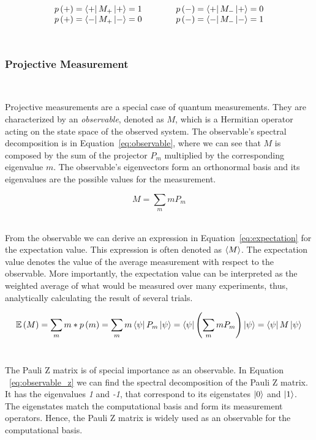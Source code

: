 \begin{equation}\label{eq:hadamard_states}
  \begin{matrix}
    p\left(+\right) = \bra{+}M_+\ket{+} = 1 \\
    p\left(+\right) = \bra{-}M_+\ket{-} = 0
  \end{matrix} \qquad \qquad
  \begin{matrix}
    p\left(-\right) = \bra{+}M_-\ket{+} = 0\\
    p\left(-\right) = \bra{-}M_-\ket{-} = 1
  \end{matrix}
\end{equation} \

\subsubsection{Projective Measurement} \

Projective measurements are a special case of quantum measurements.
They are characterized by an \textit{observable}, denoted as \(M\),
which is a Hermitian operator acting on the state space of the observed system.
The observable's spectral decomposition is in Equation~\ref{eq:observable},
where we can see that \(M\) is composed by the sum of the projector \(P_m\)
multiplied by the corresponding eigenvalue \(m\). The observable's
eigenvectors form an orthonormal basis and its
eigenvalues are the possible values for the measurement. \

\begin{equation}\label{eq:observable}
  M = \sum_{m}mP_m
\end{equation} \

From the observable we can derive an expression in Equation~\ref{eq:expectation}
for the expectation value. This expression is often denoted as \(\ev{M}\).
The expectation value denotes the value of the average measurement with
respect to the observable. More importantly, the expectation value can be
interpreted as the weighted average of what would be measured over many experiments,
thus, analytically calculating the result of several trials. \ 

\begin{equation}\label{eq:expectation}
  \mathbb{E}\left(M\right) =
  \sum_{m}m*p\left(m\right) =
  \sum_{m}m\bra{\psi}P_m\ket{\psi} =
  \bra{\psi} \left(\sum_{m}mP_m\right) \ket{\psi} =
  \bra{\psi}M\ket{\psi}
\end{equation} \

The Pauli Z matrix is of special importance as an observable. In Equation
~\ref{eq:observable_z} we can find the spectral decomposition of the
Pauli Z matrix. It has the eigenvalues \textit{1} and \textit{-1}, that
correspond to its eigenstates \(\ket{0}\) and \(\ket{1}\). The eigenstates
match the computational basis and form its measurement operators. Hence,
the Pauli Z matrix is widely used as an observable for the computational
basis. \

